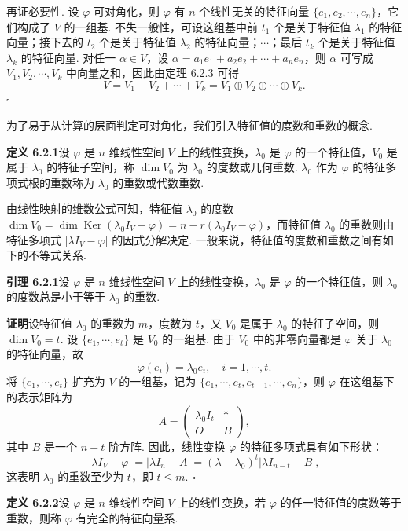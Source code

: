 \documentclass[UTF8, 12pt, fontset=fandol, oneside]{ctexart}
\begin{document}
再证必要性. 设 $\varphi$ 可对角化，则 $\varphi$ 有 $n$ 个线性无关的特征向量 $\{e_1,e_2,\cdots,e_n\}$，它们构成了 $V$ 的一组基. 不失一般性，可设这组基中前 $t_1$ 个是关于特征值 $\lambda_1$ 的特征向量；接下去的 $t_2$ 个是关于特征值 $\lambda_2$ 的特征向量；$\cdots$；最后 $t_k$ 个是关于特征值 $\lambda_k$ 的特征向量. 对任一 $\alpha\in V$，设 $\alpha=a_1e_1+a_2e_2+\cdots+a_ne_n$，则 $\alpha$ 可写成 $V_1,V_2,\cdots,V_k$ 中向量之和，因此由定理 6.2.3 可得
\[
V=V_1+V_2+\cdots+V_k=V_1\oplus V_2\oplus\cdots\oplus V_k.
\]
$\square$

为了易于从计算的层面判定可对角化，我们引入特征值的度数和重数的概念.

\noindent\textbf{定义 6.2.1}\quad 设 $\varphi$ 是 $n$ 维线性空间 $V$ 上的线性变换，$\lambda_0$ 是 $\varphi$ 的一个特征值，$V_0$ 是属于 $\lambda_0$ 的特征子空间，称 $\dim V_0$ 为 $\lambda_0$ 的度数或几何重数. $\lambda_0$ 作为 $\varphi$ 的特征多项式根的重数称为 $\lambda_0$ 的重数或代数重数.

由线性映射的维数公式可知，特征值 $\lambda_0$ 的度数 $\dim V_0=\dim\operatorname{Ker}(\lambda_0I_V-\varphi)=n-r(\lambda_0I_V-\varphi)$，而特征值 $\lambda_0$ 的重数则由特征多项式 $|\lambda I_V-\varphi|$ 的因式分解决定. 一般来说，特征值的度数和重数之间有如下的不等式关系.

\noindent\textbf{引理 6.2.1}\quad 设 $\varphi$ 是 $n$ 维线性空间 $V$ 上的线性变换，$\lambda_0$ 是 $\varphi$ 的一个特征值，则 $\lambda_0$ 的度数总是小于等于 $\lambda_0$ 的重数.

\noindent\textbf{证明}\quad 设特征值 $\lambda_0$ 的重数为 $m$，度数为 $t$，又 $V_0$ 是属于 $\lambda_0$ 的特征子空间，则 $\dim V_0=t$. 设 $\{e_1,\cdots,e_t\}$ 是 $V_0$ 的一组基. 由于 $V_0$ 中的非零向量都是 $\varphi$ 关于 $\lambda_0$ 的特征向量，故
\[
\varphi(e_i)=\lambda_0e_i,\quad i=1,\cdots,t.
\]
将 $\{e_1,\cdots,e_t\}$ 扩充为 $V$ 的一组基，记为 $\{e_1,\cdots,e_t,e_{t+1},\cdots,e_n\}$，则 $\varphi$ 在这组基下的表示矩阵为
\begin{equation}
A=\left(\begin{array}{cc}
\lambda_0I_t & *\\
O & B
\end{array}\right),
\tag{6.2.5}
\end{equation}
其中 $B$ 是一个 $n-t$ 阶方阵. 因此，线性变换 $\varphi$ 的特征多项式具有如下形状：
\[
|\lambda I_V-\varphi|=|\lambda I_n-A|=(\lambda-\lambda_0)^t|\lambda I_{n-t}-B|,
\]
这表明 $\lambda_0$ 的重数至少为 $t$，即 $t\leq m$. $\square$

\noindent\textbf{定义 6.2.2}\quad 设 $\varphi$ 是 $n$ 维线性空间 $V$ 上的线性变换，若 $\varphi$ 的任一特征值的度数等于重数，则称 $\varphi$ 有完全的特征向量系.
\end{document}

